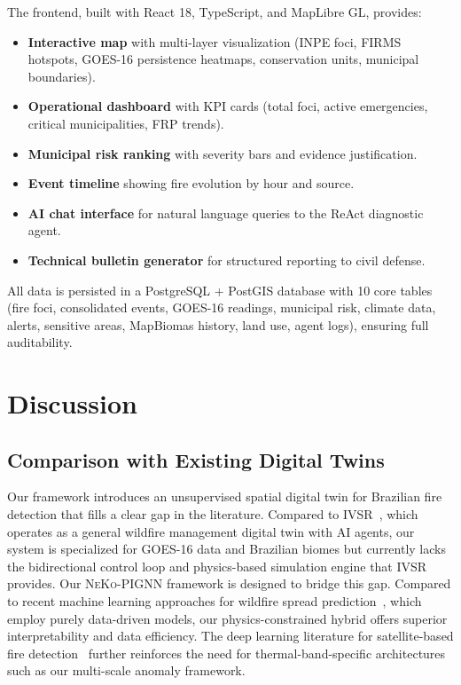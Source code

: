 \documentclass[5p,twocolumn]{elsarticle}
\newcommand{\abbrev}[1]{{\small\textsc{#1}}}
\begin{document}
The frontend, built with React 18, TypeScript, and MapLibre GL, provides:
\begin{itemize}
  \item \textbf{Interactive map} with multi-layer visualization (\abbrev{INPE} foci, \abbrev{FIRMS} hotspots, \abbrev{GOES-16} persistence heatmaps, conservation units, municipal boundaries).
  \item \textbf{Operational dashboard} with \abbrev{KPI} cards (total foci, active emergencies, critical municipalities, \abbrev{FRP} trends).
  \item \textbf{Municipal risk ranking} with severity bars and evidence justification.
  \item \textbf{Event timeline} showing fire evolution by hour and source.
  \item \textbf{AI chat interface} for natural language queries to the ReAct diagnostic agent.
  \item \textbf{Technical bulletin generator} for structured reporting to civil defense.
\end{itemize}

All data is persisted in a PostgreSQL + PostGIS database with 10 core tables (fire foci, consolidated events, GOES-16 readings, municipal risk, climate data, alerts, sensitive areas, MapBiomas history, land use, agent logs), ensuring full auditability.

\section{Discussion}
\label{sec:discussion}

\subsection{Comparison with Existing Digital Twins}

Our framework introduces an unsupervised spatial digital twin for Brazilian fire detection that fills a clear gap in the literature. Compared to \abbrev{IVSR}~\cite{morsali2026}, which operates as a general wildfire management digital twin with \abbrev{AI} agents, our system is specialized for \abbrev{GOES-16} data and Brazilian biomes but currently lacks the bidirectional control loop and physics-based simulation engine that \abbrev{IVSR} provides. Our \abbrev{NeKo-PIGNN} framework is designed to bridge this gap. Compared to recent machine learning approaches for wildfire spread prediction~\cite{schmidt2025_fires,chowdhury2023_wildfire,de2023_cnn}, which employ purely data-driven models, our physics-constrained hybrid offers superior interpretability and data efficiency. The deep learning literature for satellite-based fire detection~\cite{ba2022_wildfire} further reinforces the need for thermal-band-specific architectures such as our multi-scale anomaly framework.
\end{document}
